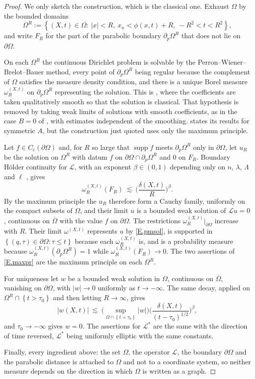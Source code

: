 \documentclass[10pt,a4paper]{amsart}
\numberwithin{equation}{section}
\DeclareMathOperator{\supp}{supp}
\newcommand{\abs}[1]{\left\vert#1\right\vert}
\newcommand{\set}[1]{\left\{#1\right\}}
\newcommand{\om}{\Omega}
\newcommand{\pom}{\partial\Omega}
\newcommand{\pd}{\partial}
\newcommand{\LL}{\mathcal L}
\begin{document}
\begin{proof}
We only sketch the construction, which is the classical one. Exhaust $\om$ by
the bounded domains
$$\om^R:=\set{(X,t)\in\om:\ \abs x<R,\ x_n<\phi(x,t)+R,\ -R^2<t<R^2} ,$$
and write $F_R$ for the part of the parabolic boundary $\pd_p\om^R$ that does
not lie on $\pom$.\medskip

On each $\om^R$ the continuous Dirichlet problem is solvable by the
Perron--Wiener--Brelot--Bauer method, every point of $\pd_p\om^R$ being regular
because the complement of $\om$ satisfies the measure density condition, and
there is a unique Borel measure $\omega_R^{(X,t)}$ on $\pd_p\om^R$ representing
the solution. This is \cite[\S1]{N}, where the coefficients are taken
qualitatively smooth so that the solution is classical. That hypothesis is
removed by taking weak limits of solutions with smooth coefficients, as in
the case $B=0$ of \cite[Chapter I, \S3]{HLmem}, with estimates independent of
the smoothing.
\cite{N} states its results for symmetric $A$, but the construction just quoted
uses only the maximum principle.

Let $f\in C_c(\pom)$ and, for $R$ so large that $\supp f$ meets $\pd_p\om^R$
only in $\pom$, let $u_R$ be the solution on $\om^R$ with datum $f$ on
$\pom\cap\pd_p\om^R$ and $0$ on $F_R$. Boundary H\"older continuity for $\LL$,
with an exponent $\beta\in(0,1)$ depending only on $n$, $\lambda$, $\Lambda$
and $\ell$ \cite[Chapter I, Lemma 3.9]{HLmem}, gives
$$\omega_R^{(X,t)}(F_R)\ \lesssim\ \Big(\frac{\delta(X,t)}R\Big)^\beta .$$
By the maximum principle the $u_R$ therefore form a Cauchy family, uniformly on
the compact subsets of $\om$, and their limit $u$ is a bounded weak solution of
$\LL u=0$, continuous on $\overline\om$ with the value $f$ on $\pom$. The
restrictions $\omega_R^{(X,t)}\big|_{\pom}$ increase with $R$. Their limit
$\omega^{(X,t)}$ represents $u$ by \eqref{E.pmsol}, is supported in
$\set{(q,\tau)\in\pom:\tau\le t}$ because each $\omega^{(X,t)}_R$ is, and is a probability
measure because $\omega_R^{(X,t)}(\pd_p\om^R)=1$ while
$\omega_R^{(X,t)}(F_R)\to0$. The two assertions of \eqref{E.maxpr} are the
maximum principle on each $\om^R$.\medskip

For uniqueness let $w$ be a bounded weak solution in $\om$, continuous on
$\overline\om$, vanishing on $\pom$, with $\abs w\to0$ uniformly as
$t\to-\infty$. The same decay, applied on $\om^R\cap\set{t>\tau_0}$ and then
letting $R\to\infty$, gives
$$\abs{w(X,t)}\ \lesssim\ \Big(\sup_{\om\cap\set{t=\tau_0}}\abs w\Big)
  \Big(\frac{\delta(X,t)}{(t-\tau_0)^{1/2}}\Big)^\beta ,$$
and $\tau_0\to-\infty$ gives $w=0$. The assertions for $\LL^*$ are the same
with the direction of time reversed, $\LL^*$ being uniformly elliptic with the
same constants.

Finally, every ingredient above: the set $\om$, the operator $\LL$, the
boundary $\pom$ and the parabolic distance is attached to $\om$ and not to a
coordinate system, so neither measure depends on the direction in which $\om$ is
written as a graph.
\end{proof}
\end{document}

